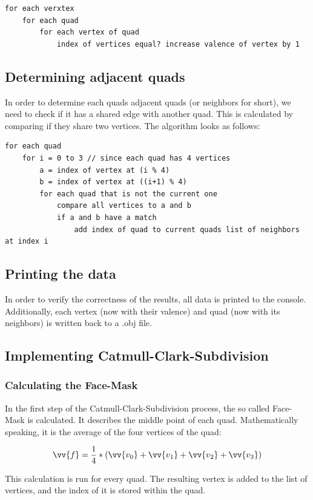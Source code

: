 \documentclass[12pt,a4paper]{scrartcl}
\begin{document}
\begin{lstlisting}[language=PSEUDO]
for each verxtex 
	for each quad 
 		for each vertex of quad
   			index of vertices equal? increase valence of vertex by 1
\end{lstlisting}

\subsection{Determining adjacent quads}
In order to determine each quads adjacent quads (or neighbors for short), we need to check if it has a shared edge with another quad. This is calculated by comparing if they share two vertices. The algorithm looks as follows:

\begin{lstlisting}[language=PSEUDO]
for each quad
	for i = 0 to 3 // since each quad has 4 vertices
		a = index of vertex at (i % 4)
		b = index of vertex at ((i+1) % 4)
		for each quad that is not the current one
			compare all vertices to a and b
			if a and b have a match
				add index of quad to current quads list of neighbors at index i 
\end{lstlisting} 

\subsection{Printing the data}
In order to verify the correctness of the results, all data is printed to the console. Additionally, each vertex (now with their valence) and quad (now with its neighbors) is written back to a .obj file.

\subsection{Implementing Catmull-Clark-Subdivision}

\subsubsection{Calculating the Face-Mask}
In the first step of the Catmull-Clark-Subdivision process, the so called Face-Mask is calculated. It describes the middle point of each quad. Mathematically speaking, it is the average of the four vertices of the quad:

$$ \vv{f} = \frac{1}{4}*( \vv{v\textsubscript{0}} + \vv{v\textsubscript{1}} + \vv{v\textsubscript{2}} + \vv{v\textsubscript{3}}) $$

This calculation is run for every quad. The resulting vertex is added to the list of vertices, and the index of it is stored within the quad.
\end{document}
